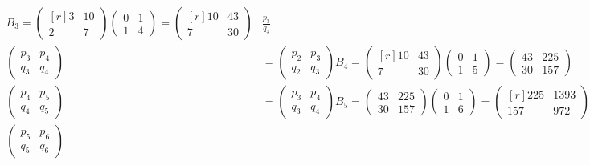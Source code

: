 \begin{loesung}
\begin{align*}
B_3
=
\begin{pmatrix*}[r]
3&10\\
2& 7
\end{pmatrix*}
\begin{pmatrix}
0&1\\
1&4
\end{pmatrix}
=
\begin{pmatrix*}[r]
10&43\\
 7&30
\end{pmatrix*}
&
\frac{p_3}{q_3}
&=
1.\underline{433}333333333333348
\\
\begin{pmatrix}
p_3&p_4\\
q_3&q_4
\end{pmatrix}
&=
\begin{pmatrix}
p_2&p_3\\
q_2&q_3
\end{pmatrix}
B_4
=
\begin{pmatrix*}[r]
10&43\\
 7&30
\end{pmatrix*}
\begin{pmatrix}
0&1\\
1&5
\end{pmatrix}
=
\begin{pmatrix}
43&225\\
30&157
\end{pmatrix}
&
\frac{p_4}{q_4}
&=
1.\underline{43312}1019108280159
\\
\begin{pmatrix}
p_4&p_5\\
q_4&q_5
\end{pmatrix}
&=
\begin{pmatrix}
p_3&p_4\\
q_3&q_4
\end{pmatrix}
B_5
=
\begin{pmatrix}
43&225\\
30&157
\end{pmatrix}
\begin{pmatrix}
0&1\\
1&6
\end{pmatrix}
=
\begin{pmatrix*}[r]
225&1393\\
157& 972
\end{pmatrix*}
&
\frac{p_5}{q_5}
&=
1.\underline{433127}572016460904
\\
\begin{pmatrix}
p_5&p_6\\
q_5&q_6
\end{pmatrix}

\end{align*}
\end{loesung}
